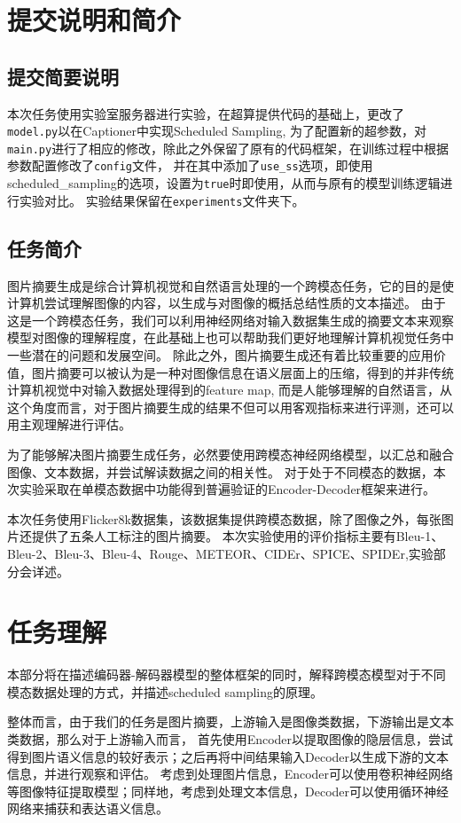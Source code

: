 \documentclass[]{ctexart}
\begin{document}
\section{提交说明和简介}

\subsection{提交简要说明}
本次任务使用实验室服务器进行实验，在超算提供代码的基础上，更改了\texttt{model.py}以在Captioner中实现Scheduled Sampling,
为了配置新的超参数，对\texttt{main.py}进行了相应的修改，除此之外保留了原有的代码框架，在训练过程中根据参数配置修改了\texttt{config}文件，
并在其中添加了\texttt{use\_ss}选项，即使用scheduled\_sampling的选项，设置为\texttt{true}时即使用，从而与原有的模型训练逻辑进行实验对比。
实验结果保留在\texttt{experiments}文件夹下。

\subsection{任务简介}
图片摘要生成是综合计算机视觉和自然语言处理的一个跨模态任务，它的目的是使计算机尝试理解图像的内容，以生成与对图像的概括总结性质的文本描述。
由于这是一个跨模态任务，我们可以利用神经网络对输入数据集生成的摘要文本来观察模型对图像的理解程度，在此基础上也可以帮助我们更好地理解计算机视觉任务中一些潜在的问题和发展空间。
除此之外，图片摘要生成还有着比较重要的应用价值，图片摘要可以被认为是一种对图像信息在语义层面上的压缩，得到的并非传统计算机视觉中对输入数据处理得到的feature map,
而是人能够理解的自然语言，从这个角度而言，对于图片摘要生成的结果不但可以用客观指标来进行评测，还可以用主观理解进行评估。

为了能够解决图片摘要生成任务，必然要使用跨模态神经网络模型，以汇总和融合图像、文本数据，并尝试解读数据之间的相关性。
对于处于不同模态的数据，本次实验采取在单模态数据中功能得到普遍验证的Encoder-Decoder框架来进行。

本次任务使用Flicker8k数据集，该数据集提供跨模态数据，除了图像之外，每张图片还提供了五条人工标注的图片摘要。
本次实验使用的评价指标主要有Bleu-1、Bleu-2、Bleu-3、Bleu-4、Rouge、METEOR、CIDEr、SPICE、SPIDEr,实验部分会详述。

\section{任务理解}
本部分将在描述编码器-解码器模型的整体框架的同时，解释跨模态模型对于不同模态数据处理的方式，并描述scheduled sampling的原理。

整体而言，由于我们的任务是图片摘要，上游输入是图像类数据，下游输出是文本类数据，那么对于上游输入而言，
首先使用Encoder以提取图像的隐层信息，尝试得到图片语义信息的较好表示；之后再将中间结果输入Decoder以生成下游的文本信息，并进行观察和评估。
考虑到处理图片信息，Encoder可以使用卷积神经网络等图像特征提取模型；同样地，考虑到处理文本信息，Decoder可以使用循环神经网络来捕获和表达语义信息。
\end{document}

